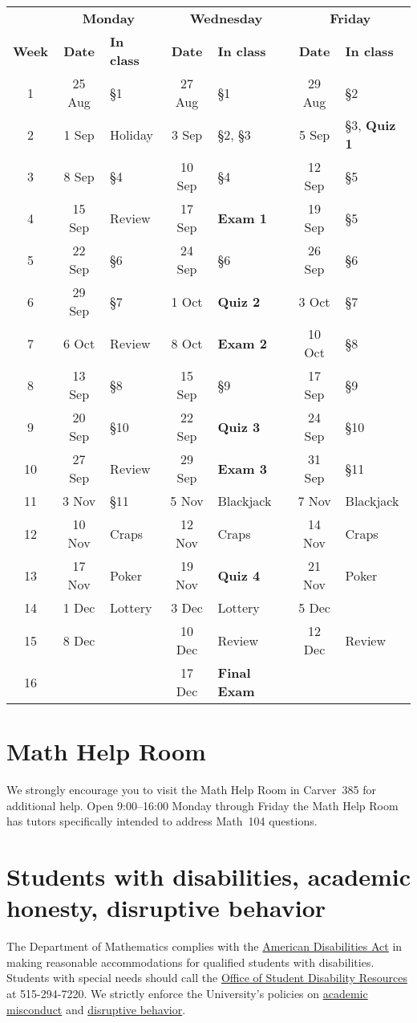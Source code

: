 \documentclass[11pt]{article}
\begin{document}
\begin{tabular}{c|cl|cl|cl}
&\multicolumn{2}{c|}{\bf Monday}
&\multicolumn{2}{c|}{\bf Wednesday}
&\multicolumn{2}{c}{\bf Friday}\\
{\bf Week}&{\bf Date}&{\bf In class}
&{\bf Date}&{\bf In class}&{\bf Date}&{\bf In class}\\\toprule
1&25 Aug&\S1&27 Aug&\S1&29 Aug&\S2\\\midrule
2&1 Sep&Holiday&3 Sep&\S2, \S3&5 Sep&\S3, {\bf Quiz 1}\\\midrule
3&8 Sep&\S4&10 Sep&\S4&12 Sep&\S5\\\midrule
4&15 Sep&Review&17 Sep&{\bf Exam 1}&19 Sep&\S5\\\midrule
5&22 Sep&\S6&24 Sep&\S6&26 Sep&\S6\\\midrule
6&29 Sep&\S7&1 Oct&{\bf Quiz 2}&3 Oct&\S7\\\midrule
7&6 Oct&Review&8 Oct&{\bf Exam 2}&10 Oct&\S8\\\midrule
8&13 Sep&\S8&15 Sep&\S9&17 Sep&\S9\\\midrule
9&20 Sep&\S10&22 Sep&{\bf Quiz 3}&24 Sep&\S10\\\midrule
10&27 Sep&Review&29 Sep&{\bf Exam 3}&31 Sep&\S11\\\midrule
11&3 Nov&\S11&5 Nov&Blackjack&7 Nov&Blackjack\\\midrule
12&10 Nov&Craps&12 Nov&Craps&14 Nov&Craps\\\midrule
13&17 Nov&Poker&19 Nov&{\bf Quiz 4}&21 Nov&Poker\\\midrule
14&1 Dec&Lottery&3 Dec&Lottery&5 Dec&\\\midrule
15&8 Dec&&10 Dec&Review&12 Dec&Review\\\midrule
16&&&17 Dec&{\bf Final Exam}&&
\end{tabular}

\section{Math Help Room}\label{MathCenter}
We strongly encourage you to visit the Math Help Room
in Carver~385 for additional help.
Open 9:00--16:00 Monday through Friday the Math Help Room
has tutors specifically intended to address Math~104 questions.

\section{Students with disabilities, academic honesty, disruptive behavior}
The Department of Mathematics complies with the 
\href{http://www.ada.gov}{American Disabilities Act} in making reasonable 
accommodations for qualified students with disabilities.  Students with 
special needs should call the 
\href{http://www.dso.iastate.edu/dr}{Office of Student Disability Resources} at
515-294-7220.
We strictly enforce the University's policies on 
\href{http://www.dso.iastate.edu/ja/academic/misconduct}{academic misconduct}
and \href{http://www.dso.iastate.edu/sa/issuesconcerns/disruption}
{disruptive behavior}.
\end{document}
